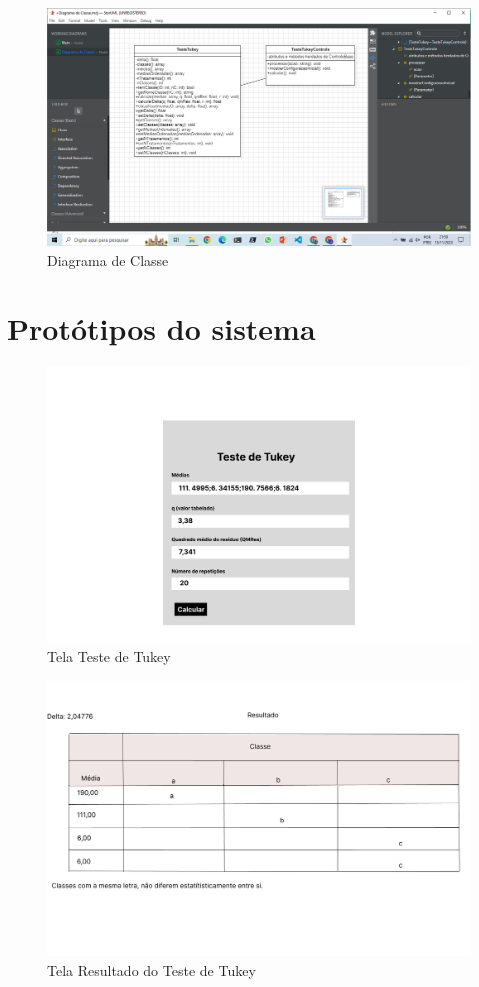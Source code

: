 \begin{figure}[H]
  \centering
  \includegraphics[width=0.8\linewidth]{imagens/classes.png} 
  \caption{Diagrama de Classe}
  \label{fig:exemplo}
\end{figure}

\chapter{Protótipos do sistema}


\begin{figure}[H]
  \centering
  \includegraphics[width=0.8\linewidth]{imagens/tela1.png} 
  \caption{Tela Teste de Tukey}
  \label{fig:exemplo}
\end{figure}

\begin{figure}[H]
  \centering
  \includegraphics[width=0.8\linewidth]{imagens/tela2.png}
  \caption{Tela Resultado do Teste de Tukey}
  \label{fig:exemplo}
\end{figure}

